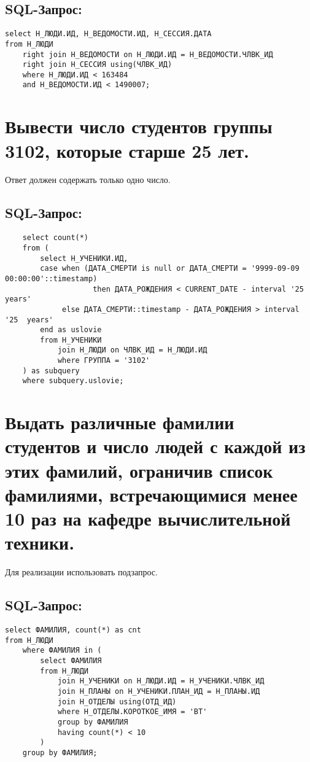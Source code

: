 \subsection{SQL-Запрос:}
\begin{verbatim}
select Н_ЛЮДИ.ИД, Н_ВЕДОМОСТИ.ИД, Н_СЕССИЯ.ДАТА
from Н_ЛЮДИ
	right join Н_ВЕДОМОСТИ on Н_ЛЮДИ.ИД = Н_ВЕДОМОСТИ.ЧЛВК_ИД
	right join Н_СЕССИЯ using(ЧЛВК_ИД)
	where Н_ЛЮДИ.ИД < 163484
	and Н_ВЕДОМОСТИ.ИД < 1490007;
\end{verbatim}

\newpage
\section{Вывести число студентов группы 3102, которые старше 25 лет.}
Ответ должен содержать только одно число.

\subsection{SQL-Запрос:}
\begin{verbatim}
    select count(*)
    from (
        select Н_УЧЕНИКИ.ИД,
        case when (ДАТА_СМЕРТИ is null or ДАТА_СМЕРТИ = '9999-09-09 00:00:00'::timestamp)
                    then ДАТА_РОЖДЕНИЯ < CURRENT_DATE - interval '25 years'
             else ДАТА_СМЕРТИ::timestamp - ДАТА_РОЖДЕНИЯ > interval '25  years'
        end as uslovie
        from Н_УЧЕНИКИ
            join Н_ЛЮДИ on ЧЛВК_ИД = Н_ЛЮДИ.ИД
            where ГРУППА = '3102'
    ) as subquery
    where subquery.uslovie;
\end{verbatim}

\newpage
\section{Выдать различные фамилии студентов и число людей с каждой из этих фамилий, ограничив список фамилиями, встречающимися менее 10 раз на кафедре вычислительной техники.}
Для реализации использовать подзапрос.
\subsection{SQL-Запрос:}
\begin{verbatim}
select ФАМИЛИЯ, count(*) as cnt
from Н_ЛЮДИ
    where ФАМИЛИЯ in (
        select ФАМИЛИЯ
        from Н_ЛЮДИ
            join Н_УЧЕНИКИ on Н_ЛЮДИ.ИД = Н_УЧЕНИКИ.ЧЛВК_ИД
            join Н_ПЛАНЫ on Н_УЧЕНИКИ.ПЛАН_ИД = Н_ПЛАНЫ.ИД
            join Н_ОТДЕЛЫ using(ОТД_ИД)
            where Н_ОТДЕЛЫ.КОРОТКОЕ_ИМЯ = 'ВТ'
            group by ФАМИЛИЯ
            having count(*) < 10
        )
    group by ФАМИЛИЯ;
\end{verbatim}

